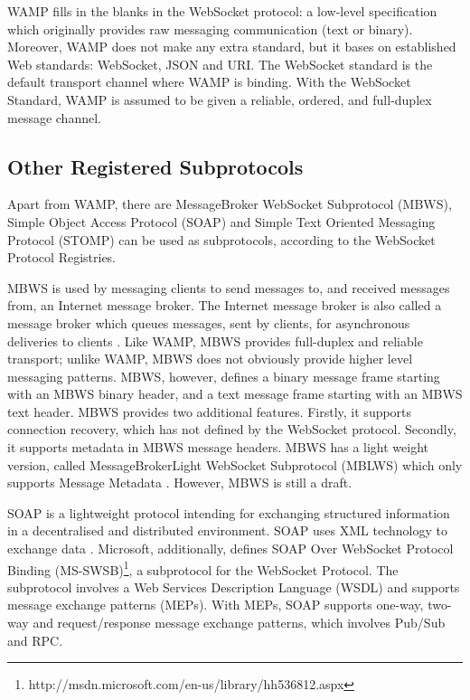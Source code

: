 WAMP fills in the blanks in the WebSocket protocol: a low-level specification which originally provides raw messaging communication (text or binary). Moreover, WAMP does not make any extra standard, but it bases on established Web standards: WebSocket, JSON and URI. The WebSocket standard is the default transport channel where WAMP is binding. With the WebSocket Standard, WAMP is assumed to be given a reliable, ordered, and full-duplex message channel. 

\subsection{Other Registered Subprotocols}

Apart from WAMP, there are MessageBroker WebSocket Subprotocol (MBWS), Simple Object Access Protocol (SOAP) and Simple Text Oriented Messaging Protocol (STOMP) can be used as subprotocols, according to the WebSocket Protocol Registries.

MBWS is used by messaging clients to send messages to, and received messages from, an Internet message broker. The Internet message broker is also called a message broker which queues messages, sent by clients, for asynchronous deliveries to clients \cite{hapner2012messagebroker}. Like WAMP, MBWS provides full-duplex and reliable transport; unlike WAMP, MBWS does not obviously provide higher level messaging patterns. MBWS, however, defines a binary message frame starting with an MBWS binary header, and a text message frame starting with an MBWS text header. MBWS provides two additional features. Firstly, it supports connection recovery, which has not defined by the WebSocket protocol. Secondly, it supports metadata in MBWS message headers. MBWS has a light weight version, called MessageBrokerLight WebSocket Subprotocol (MBLWS) which only supports Message Metadata \cite{hapner2012messagebroker}. However, MBWS is still a draft. 

SOAP is a lightweight protocol intending for exchanging structured information in a decentralised and distributed environment. SOAP uses XML technology to exchange data \cite{gudginsoap}. Microsoft, additionally, defines SOAP Over WebSocket Protocol Binding (MS-SWSB)\footnote{http://msdn.microsoft.com/en-us/library/hh536812.aspx}, a subprotocol for the WebSocket Protocol. The subprotocol involves a Web Services Description Language (WSDL) and supports message exchange patterns (MEPs). With MEPs, SOAP supports one-way, two-way and request/response message exchange patterns, which involves Pub/Sub and RPC.

